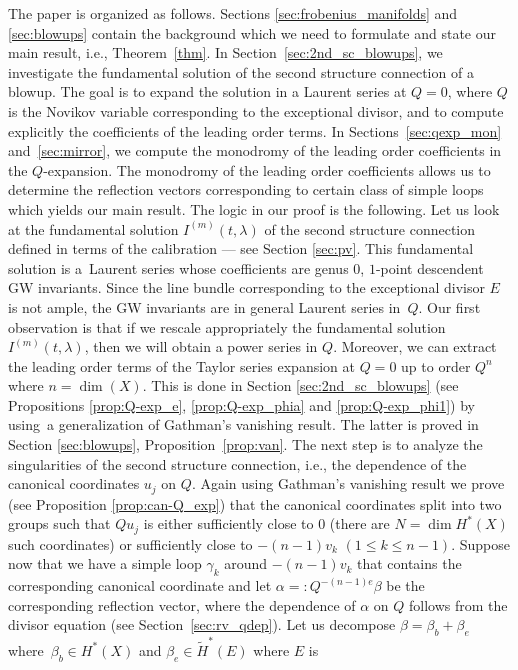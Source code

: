 \documentclass[pdftex]{sigma}
\numberwithin{equation}{section}
\begin{document}
The paper is organized as follows. Sections
\ref{sec:frobenius_manifolds} and \ref{sec:blowups} contain the
background which we need to formulate and state our main result, i.e.,
Theorem~\ref{thm}. In Section~\ref{sec:2nd_sc_blowups}, we investigate
the fundamental solution of the second structure connection of a
blowup. The goal is to expand the solution in a Laurent series at
$Q=0$, where $Q$ is the Novikov variable corresponding to the
exceptional divisor,
and to compute explicitly the coefficients of the leading order terms.
In Sections~\ref{sec:qexp_mon} and~\ref{sec:mirror}, we compute the
monodromy of the leading order coefficients in the $Q$-expansion. The
monodromy of the leading order coefficients allows us to determine the
reflection vectors corresponding to certain class of simple loops
which yields our main result. The logic in our proof is the
following. Let us look at the fundamental solution
$I^{(m)}(t,\lambda)$ of the second structure connection defined in
terms of the calibration --- see Section \ref{sec:pv}. This fundamental
solution is a~Laurent series whose coefficients are genus $0$,
$1$-point descendent GW invariants. Since the line bundle corresponding to the exceptional divisor $E$ is not ample, the
GW invariants are in general Laurent series in~$Q$. Our first
observation is that if we rescale appropriately the fundamental
solution $I^{(m)}(t,\lambda)$, then we will obtain a power series in
$Q$. Moreover, we can extract the leading order terms of the Taylor
series expansion at $Q=0$ up to order $Q^n$ where
${n=\operatorname{dim}(X)}$. This is done in Section
\ref{sec:2nd_sc_blowups} (see Propositions \ref{prop:Q-exp_e},
\ref{prop:Q-exp_phia} and \ref{prop:Q-exp_phi1}) by using~a
generalization of Gathman's vanishing result. The latter is proved in
Section \ref{sec:blowups}, Proposition~\ref{prop:van}. The next step
is to analyze the singularities of the second structure connection,
i.e., the dependence of the canonical coordinates $u_j$ on $Q$. Again
using Gathman's vanishing result we prove (see Proposition
\ref{prop:can-Q_exp}) that the canonical coordinates split into two
groups such that $Qu_j$ is either sufficiently close to $0$ (there are
$N=\operatorname{dim}H^*(X)$ such coordinates) or sufficiently close
to $-(n-1)v_k$ $(1\leq k\leq n-1)$. Suppose now that we have a simple
loop $\gamma_k$ around $ -(n-1)v_k$ that contains the corresponding
canonical coordinate and let $\alpha=: Q^{-(n-1)e}\beta $ be the
corresponding reflection vector, where the dependence of $\alpha$ on
$Q$ follows from the divisor equation (see Section~\ref{sec:rv_qdep}). Let us decompose $\beta=\beta_b+\beta_e$ where~$\beta_b \in H^*(X)$ and $\beta_e\in \widetilde{H}^*(E)$ where $E$ is
\end{document}
